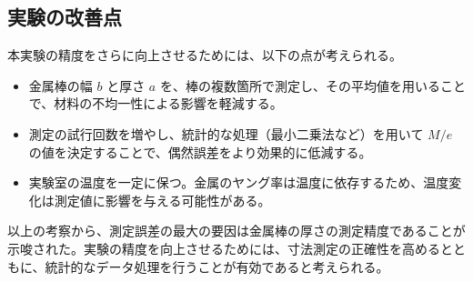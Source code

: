 \documentclass[a4paper,11pt,dvipdfmx]{jsarticle}
\begin{document}
\subsection{実験の改善点}
本実験の精度をさらに向上させるためには、以下の点が考えられる。
\begin{itemize}
    \item 金属棒の幅 $b$ と厚さ $a$ を、棒の複数箇所で測定し、その平均値を用いることで、材料の不均一性による影響を軽減する。
    \item 測定の試行回数を増やし、統計的な処理（最小二乗法など）を用いて $M/e$ の値を決定することで、偶然誤差をより効果的に低減する。
    \item 実験室の温度を一定に保つ。金属のヤング率は温度に依存するため、温度変化は測定値に影響を与える可能性がある。
\end{itemize}
以上の考察から、測定誤差の最大の要因は金属棒の厚さの測定精度であることが示唆された。実験の精度を向上させるためには、寸法測定の正確性を高めるとともに、統計的なデータ処理を行うことが有効であると考えられる。
\end{document}
